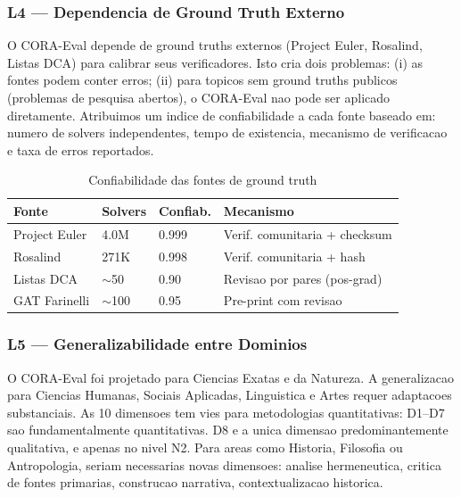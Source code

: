 \subsubsection{L4 --- Dependencia de Ground Truth Externo}

O CORA-Eval depende de ground truths externos (Project Euler, Rosalind,
Listas DCA) para calibrar seus verificadores. Isto cria dois problemas:
(i) as fontes podem conter erros; (ii) para topicos sem ground truths
publicos (problemas de pesquisa abertos), o CORA-Eval nao pode ser
aplicado diretamente. Atribuimos um indice de confiabilidade a cada
fonte baseado em: numero de solvers independentes, tempo de existencia,
mecanismo de verificacao e taxa de erros reportados.

\begin{table}[H]\centering\footnotesize
\caption{Confiabilidade das fontes de ground truth}
\label{tab:ground-truth-reliability}
\begin{tabular}{p{}p{}p{}p{}}
\toprule
\textbf{Fonte} & \textbf{Solvers} & \textbf{Confiab.} & \textbf{Mecanismo} \\
\midrule
Project Euler & 4.0M & 0.999 & Verif. comunitaria + checksum \\
Rosalind & 271K & 0.998 & Verif. comunitaria + hash \\
Listas DCA & $\sim$50 & 0.90 & Revisao por pares (pos-grad) \\
GAT Farinelli & $\sim$100 & 0.95 & Pre-print com revisao \\
\bottomrule
\end{tabular}
\end{table}

\subsubsection{L5 --- Generalizabilidade entre Dominios}

O CORA-Eval foi projetado para Ciencias Exatas e da Natureza. A
generalizacao para Ciencias Humanas, Sociais Aplicadas, Linguistica e
Artes requer adaptacoes substanciais. As 10 dimensoes tem vies para
metodologias quantitativas: D1--D7 sao fundamentalmente quantitativas.
D8 e a unica dimensao predominantemente qualitativa, e apenas no nivel
N2. Para areas como Historia, Filosofia ou Antropologia, seriam
necessarias novas dimensoes: analise hermeneutica, critica de fontes
primarias, construcao narrativa, contextualizacao historica.

